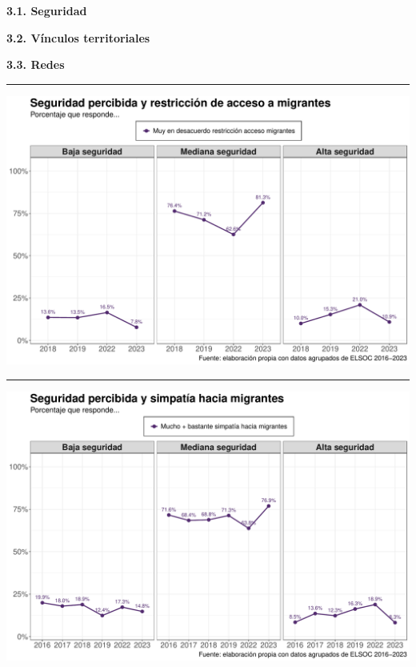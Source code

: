 \documentclass[
  spanish,
  letterpaper,
  DIV=11,
  numbers=noendperiod,
  oneside]{scrartcl}
\begin{document}
{\textbf{3.1. Seguridad}}

{\textbf{3.2. Vínculos territoriales}}

{\textbf{3.3. Redes}}

\begin{center}\rule{0.5\linewidth}{0.5pt}\end{center}

\begin{center}
\includegraphics[width=1\linewidth,height=\textheight,keepaspectratio]{cep_2025_files/figure-pdf/unnamed-chunk-4-1.pdf}
\end{center}

\begin{center}\rule{0.5\linewidth}{0.5pt}\end{center}

\begin{center}
\includegraphics[width=1\linewidth,height=\textheight,keepaspectratio]{cep_2025_files/figure-pdf/unnamed-chunk-5-1.pdf}
\end{center}
\end{document}
